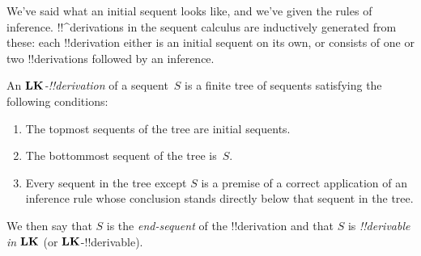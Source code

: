 \documentclass[../../../include/open-logic-section]{subfiles}
\begin{document}
      {}
      {}


\begin{explain}
We've said what an initial sequent looks like, and we've given the
rules of inference.  !!^{derivation}s in the sequent calculus are
inductively generated from these: each !!{derivation} either is an
initial sequent on its own, or consists of one or two !!{derivation}s
followed by an inference.
\end{explain}

\begin{defn}
An \emph{$\Log{LK}$-!!{derivation}} of a sequent~$S$ is a finite tree
of sequents satisfying the following conditions:
\begin{enumerate}
\item The topmost sequents of the tree are initial sequents.
\item The bottommost sequent of the tree is~$S$.
\item Every sequent in the tree except $S$ is a premise of a correct
  application of an inference rule whose conclusion stands directly
  below that sequent in the tree.
\end{enumerate}
We then say that $S$ is the \emph{end-sequent} of the !!{derivation} and
that $S$ is \emph{!!{derivable} in $\Log{LK}$} (or $\Log{LK}$-!!{derivable}).
\end{defn}
\end{document}
